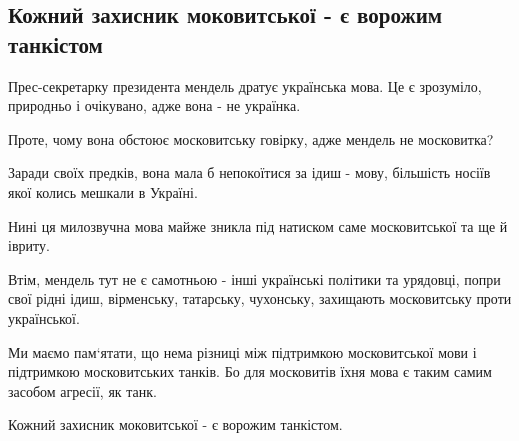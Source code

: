  
 
 
 
 

\subsection{Кожний захисник моковитської - є ворожим танкістом}

Прес-секретарку президента мендель дратує українська мова. Це є зрозуміло, природньо і очікувано, адже вона - не українка. 

Проте, чому вона обстоює московитську говірку, адже мендель не московитка?

Заради своїх предків, вона мала б непокоїтися за ідиш - мову, більшість носіїв якої колись мешкали в Україні. 

Нині ця милозвучна мова майже зникла під натиском саме московитської та ще й івриту. 

Втім, мендель тут не є самотньою - інші українські політики та урядовці, попри
свої рідні ідиш, вірменську, татарську, чухонську, захищають московитську проти
української. 

Ми маємо пам‘ятати, що нема різниці між підтримкою московитської мови і
підтримкою московитських танків. Бо для московитів їхня мова є таким самим
засобом агресії, як танк. 

Кожний захисник моковитської - є ворожим танкістом.
